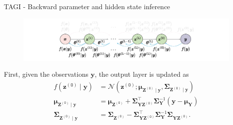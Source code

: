 \documentclass[final]{beamer}
\begin{document}
\begin{frame}[t]
\begin{columns}
\begin{column}[T]{.31\textwidth}
\begin{block}{TAGI - Backward parameter and hidden state inference}
  \begin{figure}[h!]
 \centering
  \includegraphics[width=1\textwidth]{Figures/backward_pass.pdf}
 \end{figure}


First, given the observations $\bm{y}$, the output layer is updated as
\begin{equation*} \label{eq:z0update}
\begin{split}
f\left(\boldsymbol{z}^{(\mathtt{O})} \mid \boldsymbol{y}\right) &=\mathcal{N}\left(\boldsymbol{z}^{(\mathtt{O})} ; \boldsymbol{\mu}_{\boldsymbol{Z}^{(\mathtt{O})} \mid \boldsymbol{y}}, \boldsymbol{\Sigma}_{\boldsymbol{Z}^{(\mathtt{O})} \mid \boldsymbol{y}}\right) \\
\boldsymbol{\mu}_{\boldsymbol{Z}^{(\mathtt{O})} \mid \boldsymbol{y}} &=\boldsymbol{\mu}_{\boldsymbol{Z}^{(\mathtt{O})}}+\boldsymbol{\Sigma}_{\boldsymbol{Y} \boldsymbol{Z}^{(\mathtt{O})}}^{\top} \boldsymbol{\Sigma}_{\boldsymbol{Y}}^{-1}\left(\boldsymbol{y}-\boldsymbol{\mu}_{\boldsymbol{Y}}\right) \\
\boldsymbol{\Sigma}_{\boldsymbol{Z}^{(\mathtt{O})} \mid \boldsymbol{y}} &=\boldsymbol{\Sigma}_{\boldsymbol{Z}^{(\mathtt{O})}}-\boldsymbol{\Sigma}_{\boldsymbol{Y} \boldsymbol{Z}^{(\mathtt{O})}}^{\top} \boldsymbol{\Sigma}_{\boldsymbol{Y}}^{-1} \boldsymbol{\Sigma}_{\boldsymbol{Y Z}^{(\mathtt{O})}}.
\end{split}
\end{equation*}


\end{block}
\end{column}
\end{columns}
\end{frame}
\end{document}
